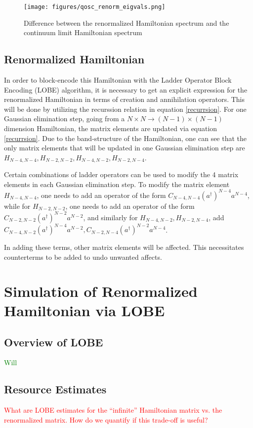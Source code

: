 \documentclass[%
 reprint,
nofootinbib,
 amsmath,amssymb,
 aps,
]{revtex4-2}
\numberwithin{equation}{section}
\begin{document}
\begin{figure}
  \label{qosc_renorm_eigvals}
  \texttt{[image: figures/qosc\_renorm\_eigvals.png]}
  \caption{Difference between the renormalized Hamiltonian spectrum and the continuum limit Hamiltonian spectrum}
\end{figure}

\subsection{Renormalized Hamiltonian}
In order to block-encode this Hamiltonian with the Ladder Operator Block Encoding (LOBE) algorithm, it is necessary to get an explicit expression for the renormalized Hamiltonian in terms of creation and annihilation operators. 
This will be done by utilizing the recurssion relation in equation \ref{recurrsion}. For one Gaussian elimination step, going from a $N \times N \rightarrow (N - 1)\times (N - 1)$ dimension Hamiltonian, the matrix elements are updated via equation \ref{recurrsion}. Due to the band-structure of the Hamiltonian, one can see that the only matrix elements that will be updated in one Gaussian elimination step are $H_{N-4, N-4}, H_{N-2, N-2}, H_{N-4, N-2}, H_{N-2, N-4}$. 

Certain combinations of ladder operators can be used to modify the 4 matrix elements in each Gaussian elimination step. To modify the matrix element $H_{N-4, N-4}$, one needs to add an operator of the form $C_{N-4, N-4}(a^\dagger)^{N-4}a^{N-4}$, while for $H_{N-2, N-2}$, one needs to add an operator of the form $C_{N-2, N-2}(a^\dagger)^{N-2}a^{N-2}$, and similarly for $H_{N-4, N-2}, H_{N-2, N-4}$, add $C_{N-4, N-2}(a^\dagger)^{N-4}a^{N-2}, C_{N-2, N-4}(a^\dagger)^{N-2}a^{N-4}$.

In adding these terms, other matrix elements will be affected. This necessitates counterterms to be added to undo unwanted affects. 

\section{Simulation of Renormalized Hamiltonian via LOBE}
\subsection{Overview of LOBE}
\textcolor{Green}{Will}

\subsection{Resource Estimates}
\textcolor{red}{What are LOBE estimates for the ``infinite'' Hamiltonian matrix vs. the 
renormalized matrix. How do we quantify if this trade-off is useful?}
\end{document}
